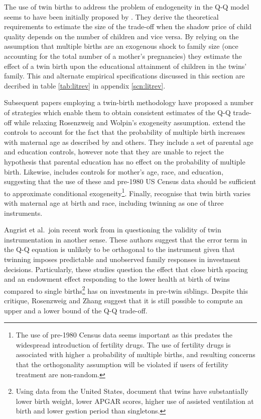 The use of twin births to address the problem of endogeneity in the Q-Q model seems to have been initially proposed by \citet{RosenzweigWolpin1980}.  They derive the theoretical requirements to estimate the size of the trade-off when the shadow price of child quality depends on the number of children and vice versa.  By relying on the assumption that multiple births are an exogenous shock to family size (once accounting for the total number of a mother's pregnancies) they estimate the effect of a twin birth upon the educational attainment of children in the twins' family.  This and alternate empirical specifications discussed in this section are decribed in table \ref{tab:litrev} in appendix \ref{scn:litrev}.  

Subsequent papers employing a twin-birth methodology have proposed a number of strategies which enable them to obtain consistent estimates of the Q-Q trade-off while relaxing Rosenzweig and Wolpin's exogeneity assumption.  \citet{Blacketal2005} extend the controls to account for the fact that the probability of multiple birth increases with maternal age as described by \citet{Jacobsenetal1999} and others.  They include a set of parental age and education controls, however note that they are unable to reject the hypothesis that parental education has no effect on the probability of multiple birth.  Likewise, \citet{Caceres2006} includes controls for mother's age, race, and education, suggesting that the use of these and pre-1980 US Census data should be sufficient to approximate conditional exogeneity\footnote{The use of pre-1980 Census data seems important as this predates the widespread introduction of fertility drugs.  The use of fertility drugs is associated with higher a probability of multiple births, and resulting concerns that the orthogonality assumption will be violated if users of fertility treatment are non-random.}.  Finally, \citet{Angristetal2010} recognise that twin birth varies with maternal age at birth and race, including twinning as one of three instruments. 

Angrist et al.\ join recent work from \citet{RosenzweigZhang2009} in questioning the validity of twin instrumentation in another sense.  These authors suggest that the error term in the Q-Q equation is unlikely to be orthogonal to the instrument given that twinning imposes predictable and unobserved family responses in investment decisions.  Particularly, these studies question the effect that close birth spacing and an endowment effect responding to the lower health at birth of twins compared to single births\footnote{Using data from the United States, \citet{Almondetal2005} document that twins have substantially lower birth weight, lower APGAR scores, higher use of assisted ventilation at birth and lower gestion period than singletons.} has on investments in pre-twin siblings.  Despite this critique, Rosenzweig and Zhang suggest that it is still possible to compute an upper and a lower bound of the Q-Q trade-off.

